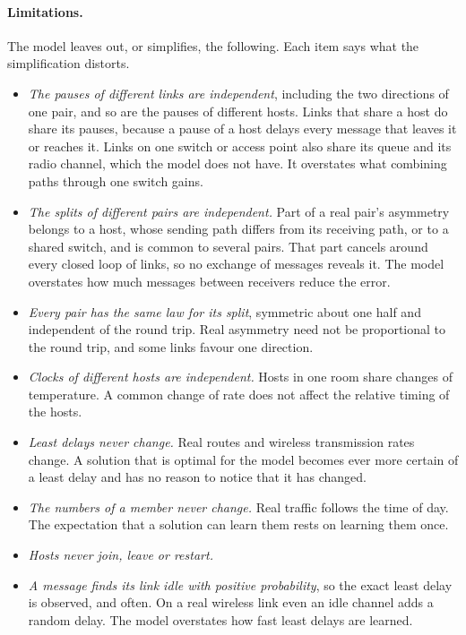 \documentclass[11pt,a4paper]{article}
\theoremstyle{definition}
\begin{document}
\paragraph{Limitations.}
The model leaves out, or simplifies, the following. Each item says what the
simplification distorts.
\begin{itemize}
\item \emph{The pauses of different links are independent}, including the
  two directions of one pair, and so are the pauses of different hosts.
  Links that share a host do share its pauses, because a pause of a host
  delays every message that leaves it or reaches it. Links on one switch or
  access point also share its queue and its radio channel, which the model
  does not have. It overstates what combining paths through one switch
  gains.
\item \emph{The splits of different pairs are independent.} Part of a real
  pair's asymmetry belongs to a host, whose sending path differs from its
  receiving path, or to a shared switch, and is common to several pairs.
  That part cancels around every closed loop of links, so no exchange of
  messages reveals it. The model overstates how much messages between
  receivers reduce the error.
\item \emph{Every pair has the same law for its split}, symmetric about one
  half and independent of the round trip. Real asymmetry need not be
  proportional to the round trip, and some links favour one direction.
\item \emph{Clocks of different hosts are independent.} Hosts in one room
  share changes of temperature. A common change of rate does not affect the
  relative timing of the hosts.
\item \emph{Least delays never change.} Real routes and wireless
  transmission rates change. A solution that is optimal for the model
  becomes ever more certain of a least delay and has no reason to notice
  that it has changed.
\item \emph{The numbers of a member never change.} Real traffic follows the time
  of day. The expectation that a solution can learn them rests
  on learning them once.
\item \emph{Hosts never join, leave or restart.}
\item \emph{A message finds its link idle with positive probability}, so the
  exact least delay is observed, and often. On a real wireless link even an
  idle channel adds a random delay. The model overstates how fast least
  delays are learned.

\end{itemize}
\end{document}
